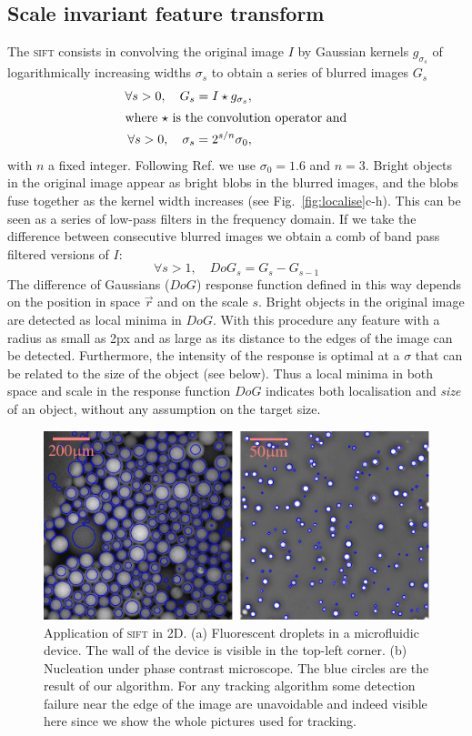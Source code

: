 \documentclass[8.5pt,twoside,twocolumn]{article}
\begin{document}
\subsection{Scale invariant feature transform} \label{sec:blur}
The \textsc{sift} consists in convolving the original image $I$ by Gaussian kernels $g_{\sigma_s}$ of logarithmically increasing widths $\sigma_s$ to obtain a series of blurred images $G_s$
\begin{align}
\forall s>0,\quad G_s = I \star g_{\sigma_s}, \label{eq:gaussian_blur}\\
\intertext{where $\star$ is the convolution operator and}
\forall s>0,\quad \sigma_{s} = 2^{s/n} \sigma_0 ,
\label{eq:sigma_s}
\end{align}
with $n$ a fixed integer. Following Ref. \cite{Lowe2004} we use $\sigma_0=1.6$ and $n=3$. Bright objects in the original image appear as bright blobs in the blurred images, and the blobs fuse together as the kernel width increases (see Fig.~\ref{fig:localise}c-h). This can be seen as a series of low-pass filters in the frequency domain. If we take the difference between consecutive blurred images we obtain a comb of band pass filtered versions of $I$: 
\begin{equation}
\forall s>1,\quad DoG_s = G_s - G_{s-1} \label{eq:DoG_s}
\end{equation}
The difference of Gaussians ($DoG$) response function defined in this way depends on the position in space $\vec{r}$ and on the scale $s$. Bright objects in the original image are detected as local minima in $DoG$. With this procedure any feature with a radius as small as \unit{2}{px} and as large as its distance to the edges of the image can be detected. Furthermore, the intensity of the response is optimal at a $\sigma$ that can be related to the size of the object (see below). Thus a local minima in both space and scale in the response function $DoG$ indicates both localisation and \emph{size} of an object, without any assumption on the target size.

\begin{figure}
	\centering
	\includegraphics{fig_applications.pdf}
	\caption{Application of \textsc{sift} in 2D. (a) Fluorescent droplets in a microfluidic device. The wall of the device is visible in the top-left corner. 
	(b) Nucleation under phase contrast microscope. The blue circles are the result of our algorithm. For any tracking algorithm some detection failure near the edge of the image are unavoidable and indeed visible here since we show the whole pictures used for tracking.}
	\label{fig:applications}
\end{figure}
\end{document}
